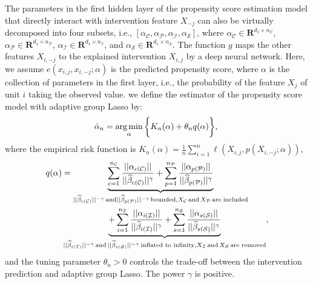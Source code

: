 \documentclass[letterpaper]{article} %
\newcommand{\mb}{\mathbf}
\DeclareMathOperator*{\argmin}{arg\,min}
\theoremstyle{definition}
\theoremstyle{remark}
\begin{document}
The parameters in the first hidden layer of the propensity score estimation model that directly interact with intervention feature $X_{-j}$ can also be virtually decomposed into four subsets, i.e., $[\alpha_\mathcal{C},\alpha_\mathcal{P},\alpha_\mathcal{I},\alpha_\mathcal{S}]$, where  $\alpha_\mathcal{C}  \in \mb{R}^{d_1 \times n_\mathcal{C}}$, $\alpha_\mathcal{P}\in \mb{R}^{d_1 \times n_\mathcal{P}}$, $\alpha_\mathcal{I}\in \mb{R}^{d_1 \times n_\mathcal{I}}$, and $\alpha_\mathcal{S}\in \mb{R}^{d_1 \times n_\mathcal{S}}$. The function $g$ maps the other features $X_{i,-j}$ to the explained intervention $X_{i,j}$ by a deep neural network. Here, we assume $e(x_{i,j}, x_{i,-j};\alpha)$ is the predicted propensity score, where $\alpha$ is the collection of parameters in the first layer, i.e., the probability of the feature $X_j$ of unit $i$ taking the observed value. we define the estimator of the propensity score model with adaptive group Lasso by:
\begin{equation}
\small
\hat{\alpha}_n = \argmin_{\alpha} \bigg\{K_n(\alpha) + \theta_n q(\alpha)\bigg\},\
\label{ps estimator}
\end{equation}
where the empirical risk function is $K_n(\alpha) = \frac{1}{n}\sum_{i=1}^{n} \ell(X_{i,j},p(X_{i,-j};\alpha))$,
\begin{align}
\small
q(\alpha) & = \underbrace{\sum_{c=1}^{n_\mathcal{C}}\frac{||\alpha_{c(\mathcal{C})}||}{||\widehat{\beta}_{c(\mathcal{C})}||^\gamma}+\sum_{p=1}^{n_\mathcal{P}}\frac{||\alpha_{p(\mathcal{P})}||}{||\widehat{\beta}_{p(\mathcal{P})}||^\gamma}}_{{||\widehat{\beta}_{c(\mathcal{C})}||^{-\gamma}} \, \text{and} {||\widehat{\beta}_{p(\mathcal{P})}||^{-\gamma}} \, \text{bounded}, X_\mathcal{C} \, \text{and} \, X_\mathcal{P} \, \text{are included}} \\
& \underbrace{+\sum_{i=1}^{n_\mathcal{I}}\frac{||\alpha_{i(\mathcal{I})}||}{||\widehat{\beta}_{i(\mathcal{I})}||^\gamma}+\sum_{s=1}^{n_\mathcal{S}}\frac{||\alpha_{s(\mathcal{S})}||}{||\widehat{\beta}_{s(\mathcal{S})}||^\gamma}}_{{||\widehat{\beta}_{i(\mathcal{I})}||^{-\gamma}} \, \text{and} \,{||\widehat{\beta}_{s(\mathcal{S})}||^{-\gamma}} \, \text{inflated to infinity},X_\mathcal{I} \, \text{and} \, X_\mathcal{S} \, \text{are removed}},
\label{Eqn:ps}
\end{align}
and the tuning parameter $\theta_n > 0$ controls the trade-off between the intervention prediction and adaptive group Lasso. The power $\gamma$ is positive.
\end{document}
